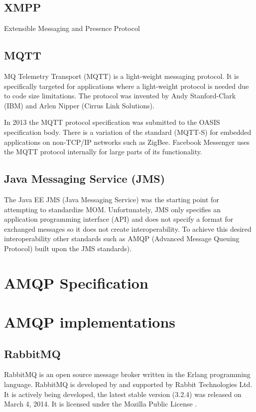 \documentclass{thesis}
\begin{document}
\subsection{XMPP}
Extensible Messaging and Presence Protocol

\subsection{MQTT}
MQ Telemetry Transport (MQTT) is a light-weight messaging protocol.  It is specifically targeted for applications where a light-weight protocol is needed due to code size limitations.  The protocol was invented by Andy Stanford-Clark (IBM) and Arlen Nipper (Cirrus Link Solutions).  

In 2013 the MQTT protocol specification was submitted to the OASIS specification body.  There is a variation of the standard (MQTT-S) for embedded applications on non-TCP/IP networks such as ZigBee.  Facebook Messenger uses the MQTT protocol internally for large parts of its functionality. 

\subsection{Java Messaging Service (JMS)}
The Java EE JMS (Java Messaging Service) was the starting point for attempting to standardize MOM. Unfortunately, JMS only specifies an application programming interface (API) and does not specify a format for exchanged messages so it does not create interoperability.   To achieve this desired interoperability other standards such as AMQP (Advanced Message Queuing Protocol) built upon the JMS standards). 



\section{AMQP Specification}


\section{AMQP implementations}


\subsection{RabbitMQ}
RabbitMQ is an open source message broker written in the Erlang programming language.   RabbitMQ is developed by and supported by Rabbit Technologies Ltd.  It is actively being developed, the latest stable version (3.2.4) was released on March 4, 2014.  It is licensed under the Mozilla Public License \cite{rabbitmq-wikipedia}.
\end{document}
